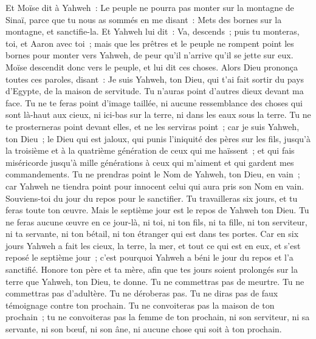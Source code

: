 \begin{multicols}{2}
 Et Moïse dit à Yahweh~: Le peuple ne pourra pas monter sur la montagne de Sinaï, parce que tu nous as sommés en me disant~: Mets des bornes sur la montagne, et sanctifie-la.
Et Yahweh lui dit~: Va, descends~; puis tu monteras, toi, et Aaron avec toi~; mais que les prêtres et le peuple ne rompent point les bornes pour monter vers Yahweh, de peur qu'il n'arrive qu'il se jette sur eux.
Moïse descendit donc vers le peuple, et lui dit ces choses.
\VerseOne{}Alors Dieu prononça toutes ces paroles, disant~:
Je suis Yahweh, ton Dieu, qui t'ai fait sortir du pays d'Egypte, de la maison de servitude.
Tu n'auras point d'autres dieux devant ma face.
Tu ne te feras point d'image taillée, ni aucune ressemblance des choses qui sont là-haut aux cieux, ni ici-bas sur la terre, ni dans les eaux sous la terre.
Tu ne te prosterneras point devant elles, et ne les serviras point~; car je suis Yahweh, ton Dieu~; le Dieu qui est jaloux, qui punis l'iniquité des pères sur les fils, jusqu'à la troisième et à la quatrième génération de ceux qui me haïssent~;
et qui fais miséricorde jusqu'à mille générations à ceux qui m'aiment et qui gardent mes commandements.
Tu ne prendras point le Nom de Yahweh, ton Dieu, en vain~; car Yahweh ne tiendra point pour innocent celui qui aura pris son Nom en vain.
Souviens-toi du jour du repos pour le sanctifier.
Tu travailleras six jours, et tu feras toute ton œuvre.
Mais le septième jour est le repos de Yahweh ton Dieu. Tu ne feras aucune œuvre en ce jour-là, ni toi, ni ton fils, ni ta fille, ni ton serviteur, ni ta servante, ni ton bétail, ni ton étranger qui est dans tes portes.
Car en six jours Yahweh a fait les cieux, la terre, la mer, et tout ce qui est en eux, et s'est reposé le septième jour~; c'est pourquoi Yahweh a béni le jour du repos et l'a sanctifié.
Honore ton père et ta mère, afin que tes jours soient prolongés sur la terre que Yahweh, ton Dieu, te donne.
Tu ne commettras pas de meurtre.
Tu ne commettras pas d'adultère.
Tu ne déroberas pas.
Tu ne diras pas de faux témoignage contre ton prochain.
Tu ne convoiteras pas la maison de ton prochain~; tu ne convoiteras pas la femme de ton prochain, ni son serviteur, ni sa servante, ni son bœuf, ni son âne, ni aucune chose qui soit à ton prochain.

\end{multicols}
